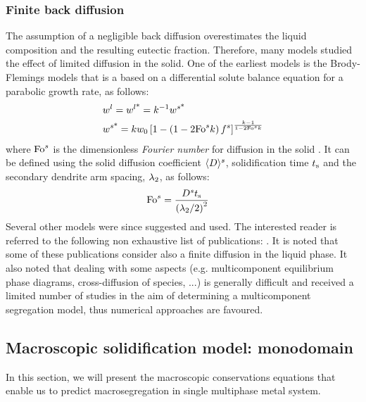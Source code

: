 \subsubsection*{Finite back diffusion}
The assumption of a negligible back diffusion overestimates the liquid composition
and the resulting eutectic fraction. Therefore, many models studied the effect of limited diffusion in the solid. 
One of the earliest models is the Brody-Flemings models \citep{brody_solute_1966} that is a based on a differential solute balance equation for a parabolic growth rate, as follows:
\begin{align}
\label{eq:brodyflemings}
& {w}^l= {w}^{l \text{*}}  = k^{-1}  {w}^{s \text{*}}  \\
& {w}^{s \text{*}} = k {w}_0 \left[  1 - \left(  1 - 2 \text{Fo}^s k  \right) {f^s}  \right]^{\frac{k-1}{1 - 2 \text{Fo}^s k }}
\end{align}
where $\text{Fo}^s$ is the dimensionless \emph{Fourier number} for diffusion in the solid \citep{dantzig_solidification_2009}. 
It can be defined using the solid diffusion coefficient $\langle D \rangle^s$, solidification time $t_\text{s}$ and the secondary 
dendrite arm spacing, ${\lambda}_{2}$, as follows: 
\begin{align}
\label{eq:fouriersolid}
& \text{Fo}^s = \frac{D^s t_\text{s}}{\left( {\lambda}_{2} / 2 \right)^2}
\end{align}
Several other models were since suggested and used. The interested reader is referred to the following non 
exhaustive list of publications: \citet{clyne_solute_1981,kobayashi_solute_1988,ni_volume-averaged_1991,wang_multiphase_1993,
combeau_modeling_1996,martorano_solutal_2003,tourret_generalized_2009}. It is noted that some of these publications consider 
also a finite diffusion in the liquid phase. It also noted that dealing with some aspects 
(e.g. multicomponent equilibrium phase diagrams, cross-diffusion of species, ...) is generally difficult
and received a limited number of studies in the aim of determining a multicomponent segregation model, thus numerical approaches are favoured.

\subsection{Macroscopic solidification model: monodomain} \label{sec:monodomain}
In this section, we will present the macroscopic conservations equations that enable us to predict 
macrosegregation in single multiphase metal system.
